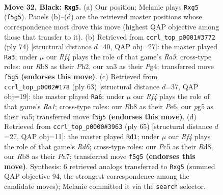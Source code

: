 \documentclass[11pt]{article}
\begin{document}
\clearpage

\begin{figure}[p]\centering
\begin{subfigure}{0.46\textwidth}\centering
\resizebox{\linewidth}{!}{%
\newchessgame
\chessboard[
  setfen={1r6/pp4k1/8/2p2rP1/4p1b1/N3P3/PP4K1/R1B5 b - - 2 32},
  showmover=false,
  pgfstyle=straightmove, color=movearrow, markmove={f5-g5}
]}
\caption{}
\end{subfigure}\hfill
\begin{subfigure}{0.46\textwidth}\centering
\resizebox{\linewidth}{!}{%
\newchessgame
\chessboard[
  setfen={2b1r3/6pp/p2k4/R1p2P2/6P1/3K1B2/P6P/8 w - - 0 38},
  showmover=false,
  pgfstyle=straightmove, color=movearrow, markmove={a5-a3}
]}
\caption{}
\end{subfigure}
\\[4pt]
\begin{subfigure}{0.46\textwidth}\centering
\resizebox{\linewidth}{!}{%
\newchessgame
\chessboard[
  setfen={r5k1/3b4/1B2p1p1/Nn1p2P1/3P4/7P/5KP1/7R b - - 3 32},
  showmover=false,
  pgfstyle=straightmove, color=movearrow, markmove={a8-a6}
]}
\caption{}
\end{subfigure}\hfill
\begin{subfigure}{0.46\textwidth}\centering
\resizebox{\linewidth}{!}{%
\newchessgame
\chessboard[
  setfen={3r4/pp3p1k/2p4p/4B2N/7P/1P1r4/P5PK/R7 b - - 0 33},
  showmover=false,
  pgfstyle=straightmove, color=movearrow, markmove={d3-d1}
]}
\caption{}
\end{subfigure}
\caption{\textbf{Move 32, Black: \texttt{Rxg5}.} (a) Our position; Melanie plays \texttt{Rxg5} (\texttt{f5g5}). Panels (b)--(d) are the retrieved master positions whose correspondence most drove this move (highest QAP objective among those that transfer to it). (b) Retrieved from \texttt{ccrl\_top\_p0001\#3772} (ply 74) [structural distance $d$=40, QAP obj=27]: the master played \texttt{Ra3}; under $\mu$ our \emph{Rf4} plays the role of that game's \emph{Ra5}; cross-type roles: our \emph{R}b8 as their \emph{P}h2, our \emph{n}a3 as their \emph{P}g4; transferred move \texttt{f5g5} \textbf{(endorses this move)}. (c) Retrieved from \texttt{ccrl\_top\_p0002\#178} (ply 63) [structural distance $d$=37, QAP obj=19]: the master played \texttt{Ra6}; under $\mu$ our \emph{Rf4} plays the role of that game's \emph{Ra1}; cross-type roles: our \emph{R}b8 as their \emph{P}e6, our \emph{p}g5 as their \emph{n}a5; transferred move \texttt{f5g5} \textbf{(endorses this move)}. (d) Retrieved from \texttt{ccrl\_top\_p0000\#3963} (ply 65) [structural distance $d$=27, QAP obj=11]: the master played \texttt{Rd1}; under $\mu$ our \emph{Rf4} plays the role of that game's \emph{Rd6}; cross-type roles: our \emph{P}c5 as their \emph{R}d8, our \emph{R}b8 as their \emph{P}a7; transferred move \texttt{f5g5} \textbf{(endorses this move)}. Synthesis: 6 retrieved analogs transferred to \texttt{Rxg5} (summed QAP objective 94, the strongest correspondence among the candidate moves); Melanie committed it via the \texttt{search} selector.}
\label{fig:thought-m63}
\end{figure}
\end{document}
